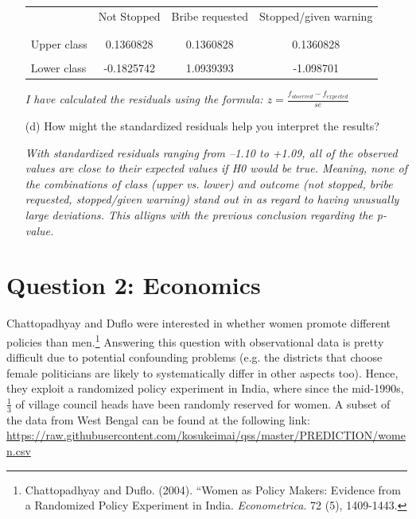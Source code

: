 \documentclass[12pt,letterpaper]{article}
\begin{document}
\begin{enumerate}
	\begin{table}[h]
		\centering
		\begin{tabular}{l | c c c }
			& Not Stopped & Bribe requested & Stopped/given warning \\
			\\[-1.8ex] 
			\hline \\[-1.8ex]
			Upper class  & 0.1360828   & 0.1360828   & 0.1360828  \\
			\\
			Lower class & -0.1825742   &   1.0939393  &   -1.098701 \\
			
		\end{tabular}
	\end{table}
	
\textit{	I have calculated the residuals using the formula: $z =\frac{f_{observed}-f_{expected}}{se}$}

	\item [(d)] How might the standardized residuals help you interpret the results?  
	
	\textit{With standardized residuals ranging from –1.10 to +1.09, all of the observed values are close to their expected values if H0 would be true. Meaning, none of the  combinations of class (upper vs. lower) and outcome (not stopped, bribe requested, stopped/given warning) stand out in as regard to having unusually large deviations. 
		This alligns with the previous conclusion regarding the p-value. }
	
\end{enumerate}

\section*{Question 2: Economics}
Chattopadhyay and Duflo were interested in whether women promote different policies than men.\footnote{Chattopadhyay and Duflo. (2004). ``Women as Policy Makers: Evidence from a Randomized Policy Experiment in India. \textit{Econometrica}. 72 (5), 1409-1443.} Answering this question with observational data is pretty difficult due to potential confounding problems (e.g. the districts that choose female politicians are likely to systematically differ in other aspects too). Hence, they exploit a randomized policy experiment in India, where since the mid-1990s, $\frac{1}{3}$ of village council heads have been randomly reserved for women. A subset of the data from West Bengal can be found at the following link: \url{https://raw.githubusercontent.com/kosukeimai/qss/master/PREDICTION/women.csv}\\
\end{document}
